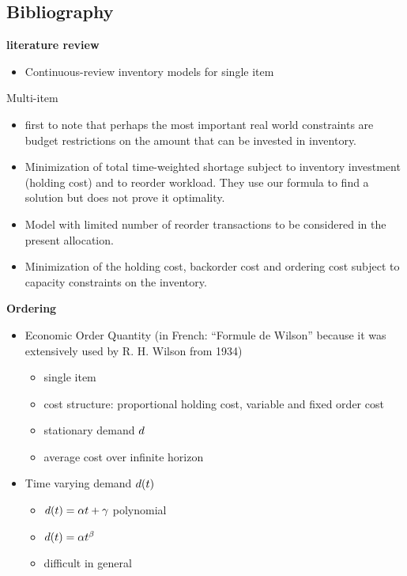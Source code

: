 \subsection{Bibliography}

\textbf{literature review}

\begin{itemize}
   \item \cite{Gayon2016} Continuous-review inventory models for single item
\end{itemize} 

Multi-item

\begin{itemize}
  \item \cite{Hadley1963} first to note that perhaps the most important real world constraints are budget restrictions on the amount that can be invested in inventory.
  \item \cite{Schrady1971} Minimization of total time-weighted shortage subject to inventory investment (holding cost) and to reorder workload. They use our formula to find a solution but does not prove it optimality.
  \item \cite{Daeschner1975} Model with limited number of reorder transactions to be considered in the present allocation.
  \item \cite{Ohno2001} Minimization of the holding cost, backorder cost and ordering cost subject to capacity constraints on the inventory.
\end{itemize}


\medskip

\textbf{Ordering}

\begin{itemize}
  \item \cite{Harris1913} Economic Order Quantity (in French: ``Formule de Wilson'' because it was extensively used by R. H. Wilson from 1934)
  \begin{itemize}
    \item single item
    \item cost structure: proportional holding cost, variable and fixed order cost
    \item stationary demand $d$
    \item average cost over infinite horizon
  \end{itemize}
  \item Time varying demand $d(t)$
  \begin{itemize}
    \item \cite{Resh1976,Donaldson1977} $d(t)=\alpha t+\gamma$ polynomial
    \item \cite{Barbosa1978} $d(t)=\alpha t^{\beta}$
    \item difficult in general
  \end{itemize}
\end{itemize}

